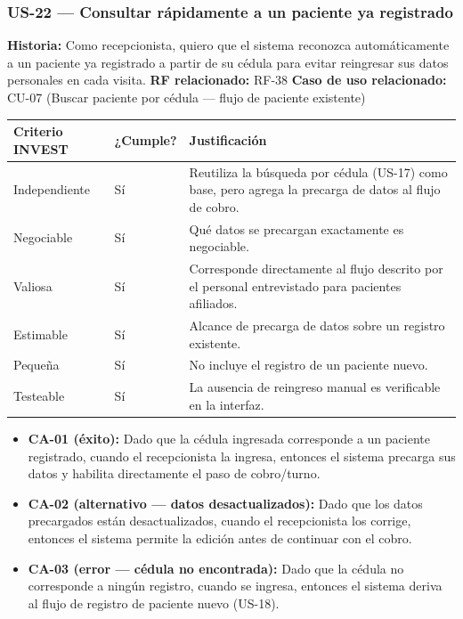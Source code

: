 \documentclass[11pt,a4paper]{article}
\providecommand{\tightlist}{%
	\setlength{\itemsep}{0pt}\setlength{\parskip}{0pt}}
\begin{document}
	\subsubsection{US-22 --- Consultar rápidamente a un paciente ya registrado}
	
	\textbf{Historia:} Como recepcionista, quiero que el sistema reconozca automáticamente a un paciente ya registrado a partir de su cédula para evitar reingresar sus datos personales en cada visita.
	\textbf{RF relacionado:} RF-38
	\textbf{Caso de uso relacionado:} CU-07 (Buscar paciente por cédula --- flujo de paciente existente)
	
	\begin{longtable}{p{} p{} p{}}
		
		
		\toprule
		\textbf{Criterio INVEST} &
		\textbf{¿Cumple?} &
		\textbf{Justificación} \\
		\midrule
		\endhead
		
		Independiente & Sí & Reutiliza la búsqueda por cédula (US-17) como base, pero agrega la precarga de datos al flujo de cobro. \\
		Negociable & Sí & Qué datos se precargan exactamente es negociable. \\
		Valiosa & Sí & Corresponde directamente al flujo descrito por el personal entrevistado para pacientes afiliados. \\
		Estimable & Sí & Alcance de precarga de datos sobre un registro existente. \\
		Pequeña & Sí & No incluye el registro de un paciente nuevo. \\
		Testeable & Sí & La ausencia de reingreso manual es verificable en la interfaz. \\
		\bottomrule
	\end{longtable}
	
	
	\begin{itemize}
		\tightlist
		\item
		\textbf{CA-01 (éxito):} Dado que la cédula ingresada corresponde a un paciente registrado, cuando el recepcionista la ingresa, entonces el sistema precarga sus datos y habilita directamente el paso de cobro/turno.
		\item
		\textbf{CA-02 (alternativo --- datos desactualizados):} Dado que los datos precargados están desactualizados, cuando el recepcionista los corrige, entonces el sistema permite la edición antes de continuar con el cobro.
		\item
		\textbf{CA-03 (error --- cédula no encontrada):} Dado que la cédula no corresponde a ningún registro, cuando se ingresa, entonces el sistema deriva al flujo de registro de paciente nuevo (US-18).
	\end{itemize}
	
\end{document}
